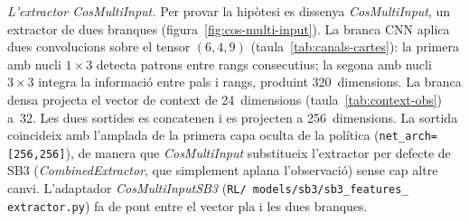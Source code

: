 \emph{L'extractor CosMultiInput.} Per provar la hipòtesi es
dissenya \emph{CosMultiInput}, un
extractor de dues branques (figura~\ref{fig:cos-multi-input}). La branca \acf{CNN} aplica
dues convolucions sobre el tensor \((6,4,9)\) (taula~\ref{tab:canals-cartes}): la primera amb nucli \(1\times3\) detecta
patrons entre rangs consecutius; la segona amb nucli \(3\times3\) integra la informació
entre pals i rangs, produint 320~dimensions. La branca densa projecta el vector de context
de 24~dimensions (taula~\ref{tab:context-obs}) a~32. Les dues sortides es concatenen i es projecten a 256~dimensions. La
sortida coincideix amb l'amplada de la primera capa oculta de la política
(\texttt{net\_arch=[256,256]}), de manera que \emph{CosMultiInput} substitueix
l'extractor per defecte de \ac{SB3} (\emph{CombinedExtractor}, que simplement aplana
l'observació) sense cap altre canvi. L'adaptador \emph{CosMultiInputSB3} (\texttt{RL/%
\allowbreak{}models/\allowbreak{}sb3/\allowbreak{}sb3\_\allowbreak{}features\_%
\allowbreak{}extractor.py}) fa de pont entre el vector pla i les dues branques.

